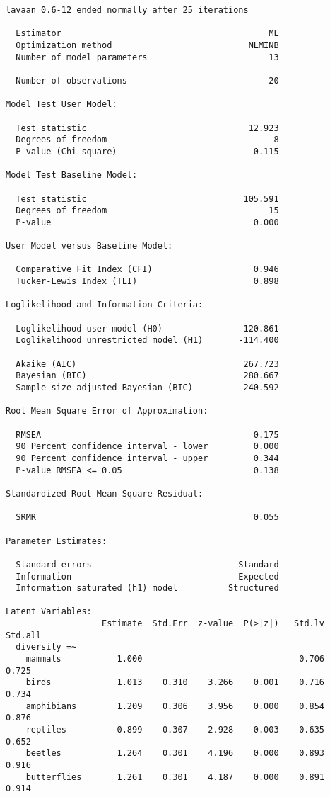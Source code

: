 \documentclass[
  letterpaper,
  DIV=11,
  numbers=noendperiod]{scrreprt}
\begin{document}
\begin{verbatim}
lavaan 0.6-12 ended normally after 25 iterations

  Estimator                                         ML
  Optimization method                           NLMINB
  Number of model parameters                        13

  Number of observations                            20

Model Test User Model:
                                                      
  Test statistic                                12.923
  Degrees of freedom                                 8
  P-value (Chi-square)                           0.115

Model Test Baseline Model:

  Test statistic                               105.591
  Degrees of freedom                                15
  P-value                                        0.000

User Model versus Baseline Model:

  Comparative Fit Index (CFI)                    0.946
  Tucker-Lewis Index (TLI)                       0.898

Loglikelihood and Information Criteria:

  Loglikelihood user model (H0)               -120.861
  Loglikelihood unrestricted model (H1)       -114.400
                                                      
  Akaike (AIC)                                 267.723
  Bayesian (BIC)                               280.667
  Sample-size adjusted Bayesian (BIC)          240.592

Root Mean Square Error of Approximation:

  RMSEA                                          0.175
  90 Percent confidence interval - lower         0.000
  90 Percent confidence interval - upper         0.344
  P-value RMSEA <= 0.05                          0.138

Standardized Root Mean Square Residual:

  SRMR                                           0.055

Parameter Estimates:

  Standard errors                             Standard
  Information                                 Expected
  Information saturated (h1) model          Structured

Latent Variables:
                   Estimate  Std.Err  z-value  P(>|z|)   Std.lv  Std.all
  diversity =~                                                          
    mammals           1.000                               0.706    0.725
    birds             1.013    0.310    3.266    0.001    0.716    0.734
    amphibians        1.209    0.306    3.956    0.000    0.854    0.876
    reptiles          0.899    0.307    2.928    0.003    0.635    0.652
    beetles           1.264    0.301    4.196    0.000    0.893    0.916
    butterflies       1.261    0.301    4.187    0.000    0.891    0.914


\end{verbatim}
\end{document}
